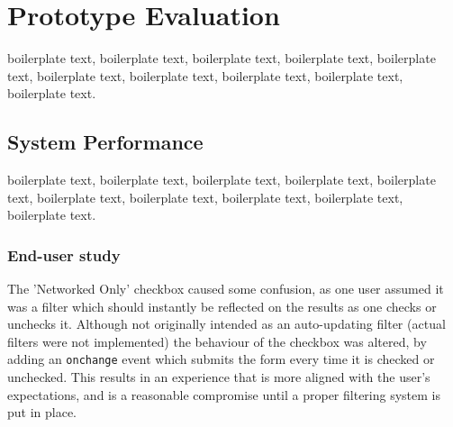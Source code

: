 \chapter{Prototype Evaluation}


boilerplate text, boilerplate text, boilerplate text, boilerplate text, boilerplate text, boilerplate text, boilerplate text, boilerplate text, boilerplate text, boilerplate text.

\section{System Performance}

boilerplate text, boilerplate text, boilerplate text, boilerplate text, boilerplate text, boilerplate text, boilerplate text, boilerplate text, boilerplate text, boilerplate text.

\subsection{End-user study}


The 'Networked Only' checkbox caused some confusion, as one user assumed it was a filter which should instantly be reflected on the results as one checks or unchecks it. Although not originally intended as an auto-updating filter (actual filters were not implemented) the behaviour of the checkbox was altered, by adding an \texttt{onchange} event which submits the form every time it is checked or unchecked. This results in an experience that is more aligned with the user's expectations, and is a reasonable compromise until a proper filtering system is put in place.




